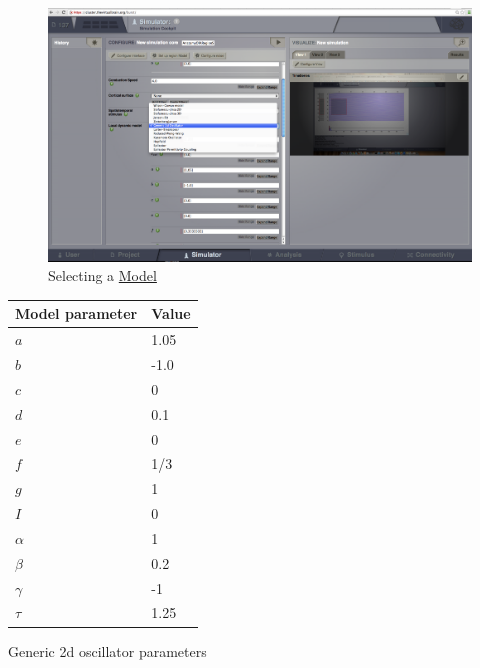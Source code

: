\documentclass{tufte-handout}
\begin{document}
\begin{figure}[h]
  \includegraphics[width=\linewidth]{Handout_UI_BuildingYourOwnBrainNetworkModel_Model}%
  \caption{Selecting a \underline{Model}}%
  \label{fig:step_01}%
\end{figure}


\begin{margintable}
  \centering
  \selectfont
  \begin{tabular}{ll}
    \toprule
    Model parameter & Value \\
    \midrule
             $a$          &   1.05   \\
             $b$          &  -1.0    \\
             $c$           &   0        \\
             $d$           &   0.1    \\
             $e$           &   0        \\
             $f$            &   1/3    \\
             $g$           &   1        \\
             $I$            &   0        \\
             $\alpha$   &   1        \\
             $\beta$     &   0.2     \\
             $\gamma$&  -1       \\
             $\tau$       &   1.25   \\
    \bottomrule
  \end{tabular}
  \caption{Generic 2d oscillator parameters}
  \label{tab:modeltab}
\end{margintable}



\end{document}
